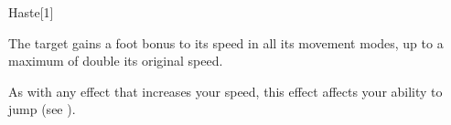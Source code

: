 \begin{spellsection}{Haste}[1]
    \begin{spellheader}
    \end{spellheader}
    \begin{spellcontent}
        \begin{spelltargetinginfo}
        \end{spelltargetinginfo}
        \begin{spelleffects}
            \spelleffect The target gains a  foot bonus to its speed in all its movement modes, up to a maximum of double its original speed.
            \spelldur \durshort \dismissable
        \end{spelleffects}
    \end{spellcontent}
    \begin{spellfooter}
        \spellnotes As with any effect that increases your speed, this effect affects your ability to jump (see ).
        \miscastrandom
    \end{spellfooter}
    \begin{spellaugments}
    \end{spellaugments}
\end{spellsection}

